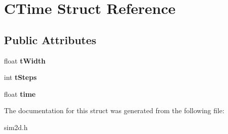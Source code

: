 \hypertarget{struct_c_time}{}\section{C\+Time Struct Reference}
\label{struct_c_time}
\subsection*{Public Attributes}
\begin{DoxyCompactItemize}
\item 
\hypertarget{struct_c_time_a039e539b4d1cdc2d1c107b9f5433d1f1}{}float {\bfseries t\+Width}\label{struct_c_time_a039e539b4d1cdc2d1c107b9f5433d1f1}

\item 
\hypertarget{struct_c_time_aba83d74cc8533332c5097928aeb064af}{}int {\bfseries t\+Steps}\label{struct_c_time_aba83d74cc8533332c5097928aeb064af}

\item 
\hypertarget{struct_c_time_a535198c45cd06438fbde47dad4ad1872}{}float {\bfseries time}\label{struct_c_time_a535198c45cd06438fbde47dad4ad1872}

\end{DoxyCompactItemize}


The documentation for this struct was generated from the following file\+:\begin{DoxyCompactItemize}
\item 
sim2d.\+h\end{DoxyCompactItemize}
